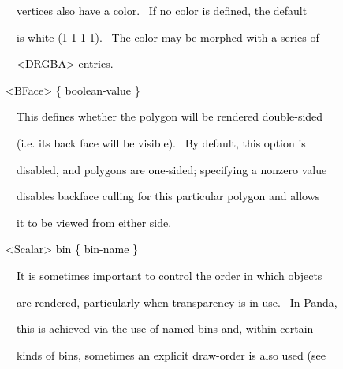 \documentclass[a4paper]{article}
\newcommand\textstyleOOoComputerKeyWord[1]{\textrm{\textcolor[rgb]{0.0,0.0,0.5019608}{#1}}}
\begin{document}
{\color{black}
\textstyleOOoComputerKeyWord{\textcolor{black}{\ \ \ \ vertices also have a color. \ If no color is defined, the
default}}}

{\color{black}
\textstyleOOoComputerKeyWord{\textcolor{black}{\ \ \ \ is white (1 1 1 1). \ The color may be morphed with a series
of}}}

{\color{black}
\textstyleOOoComputerKeyWord{\textcolor{black}{\ \ \ \ {\textless}DRGBA{\textgreater} entries.}}}


\bigskip


\bigskip

{\color{black}
\textstyleOOoComputerKeyWord{\textcolor{black}{\ \ {\textless}BFace{\textgreater} \{ boolean-value \}}}}


\bigskip

{\color{black}
\textstyleOOoComputerKeyWord{\textcolor{black}{\ \ \ \ This defines whether the polygon will be rendered double-sided}}}

{\color{black}
\textstyleOOoComputerKeyWord{\textcolor{black}{\ \ \ \ (i.e. its back face will be visible). \ By default, this option
is}}}

{\color{black}
\textstyleOOoComputerKeyWord{\textcolor{black}{\ \ \ \ disabled, and polygons are one-sided; specifying a nonzero
value}}}

{\color{black}
\textstyleOOoComputerKeyWord{\textcolor{black}{\ \ \ \ disables backface culling for this particular polygon and
allows}}}

{\color{black}
\textstyleOOoComputerKeyWord{\textcolor{black}{\ \ \ \ it to be viewed from either side.}}}


\bigskip


\bigskip

{\color{black}
\textstyleOOoComputerKeyWord{\textcolor{black}{\ \ {\textless}Scalar{\textgreater} bin \{ bin-name \}}}}


\bigskip

{\color{black}
\textstyleOOoComputerKeyWord{\textcolor{black}{\ \ \ \ It is sometimes important to control the order in which
objects}}}

{\color{black}
\textstyleOOoComputerKeyWord{\textcolor{black}{\ \ \ \ are rendered, particularly when transparency is in use. \ In
Panda,}}}

{\color{black}
\textstyleOOoComputerKeyWord{\textcolor{black}{\ \ \ \ this is achieved via the use of named bins and, within certain}}}

{\color{black}
\textstyleOOoComputerKeyWord{\textcolor{black}{\ \ \ \ kinds of bins, sometimes an explicit draw-order is also used
(see}}}
\end{document}

